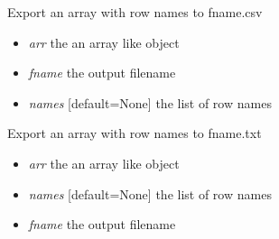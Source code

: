 \documentclass[a4paper,11pt,english]{sphinxmanual}
\begin{document}

\begin{fulllineitems}
\label{modules_doc:cbmpy.CBTools.exportLabelledArray2CSV}
Export an array with row names to fname.csv
\begin{itemize}
\item {} 
\emph{arr} the an array like object

\item {} 
\emph{fname} the output filename

\item {} 
\emph{names} {[}default=None{]} the list of row names

\end{itemize}

\end{fulllineitems}


\begin{fulllineitems}
\label{modules_doc:cbmpy.CBTools.exportLabelledArray2TXT}
Export an array with row names to fname.txt
\begin{itemize}
\item {} 
\emph{arr} the an array like object

\item {} 
\emph{names} {[}default=None{]} the list of row names

\item {} 
\emph{fname} the output filename

\end{itemize}

\end{fulllineitems}

\end{document}
